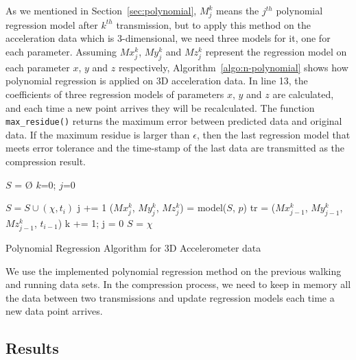 As we mentioned in Section~\ref{sec:polynomial}, $M_{j}^{k}$ means the $j^{th}$
polynomial regression model after $k^{th}$ transmission, but to apply this
method on the acceleration data which is 3-dimensional, we need three models for
it, one for each parameter. Assuming $Mx_{j}^{k}$, $My_{j}^{k}$ and $Mz_{j}^{k}$
represent the regression model on each parameter $x$, $y$ and $z$ respectively,
Algorithm~\ref{algo:n-polynomial} shows how polynomial regression is applied on
3D acceleration data. In line 13, the coefficients of three regression models of
parameters $x$, $y$ and $z$ are calculated, and each time a new point arrives
they will be recalculated. The function \texttt{max\_residue()} returns the
maximum error between predicted data and original data. If the maximum residue
is larger than $\epsilon$, then the last regression model that meets error
tolerance and the time-stamp of the last data are transmitted as the compression
result.
\begin{algorithm}
\begin{algorithmic}[1]
\Input
\EndInput
\Output
\EndOutput
\State $S$ = $\text{\O}$
\State $k$=0; $j$=0

    \State $S = S \cup (\chi, t_i)$
        \State j += 1
        \State ($Mx_{j}^{k}$, $My_{j}^{k}$, $Mz_{j}^{k}$) = model($S$, $p$)    
            \State tr = ($Mx_{j-1}^{k}$, $My_{j-1}^{k}$, $Mz_{j-1}^{k}$, $t_{i-1}$)
            \State k += 1; j = 0
            \State $S$ = $\chi$
        \EndIf
    \EndIf
\EndWhile

\end{algorithmic}
\caption{Polynomial Regression Algorithm for 3D Accelerometer data}
\label{algo:n-polynomial}
\end{algorithm}

We use the implemented polynomial regression method on the previous walking and
running data sets. In the compression process, we need to keep in memory all the
data between two transmissions and update regression models each time a new data
point arrives.

\subsection{Results}

